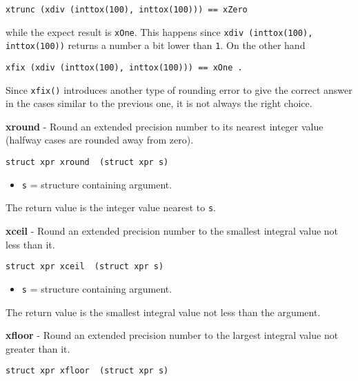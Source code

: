 \documentclass{article}
\begin{document}
\begin{verbatim}
xtrunc (xdiv (inttox(100), inttox(100))) == xZero
\end{verbatim}

while the expect result is \texttt{xOne}. This happens since
\texttt{xdiv (inttox(100), inttox(100))} returns a number a bit lower
than \texttt{1}. On the other hand

\begin{verbatim}
xfix (xdiv (inttox(100), inttox(100))) == xOne .
\end{verbatim}

Since \texttt{xfix()} introduces another type of rounding error
to give the correct answer in the cases similar to the previous
one, it is not always the right choice.


\hrulefill{}

\textbf{xround} - Round an extended precision number to its nearest integer 
value (halfway cases are rounded away from zero). 

\begin{verbatim}
struct xpr xround  (struct xpr s)
\end{verbatim}

\begin{itemize}
\item \texttt{s} = structure containing argument.
\end{itemize}

The return value is the integer value nearest to \texttt{s}.


\hrulefill{}

\textbf{xceil} - Round an extended precision number to the smallest integral 
value not less than it.

\begin{verbatim}
struct xpr xceil  (struct xpr s)
\end{verbatim}

\begin{itemize}
\item \texttt{s} = structure containing argument.
\end{itemize}

The return value is the smallest integral value not less than
the argument.


\hrulefill{}

\textbf{xfloor} - Round an extended precision number to the largest integral 
value not greater than it.

\begin{verbatim}
struct xpr xfloor  (struct xpr s)
\end{verbatim}
\end{document}
